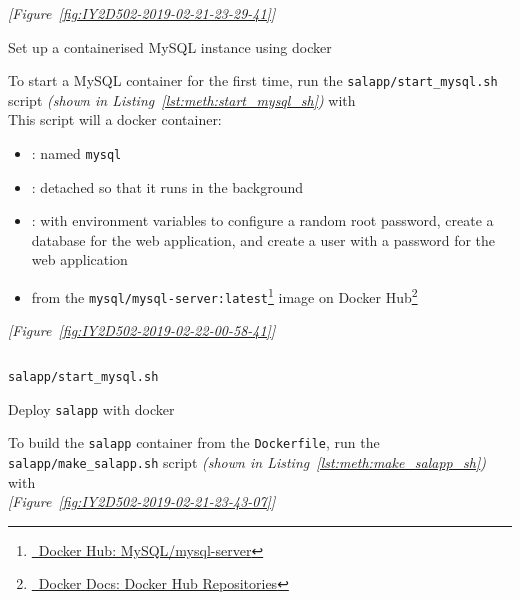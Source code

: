 \begin{methodology0}
\begin{methodology1}
      \textcolor{deep-gray}{\textit{[Figure~\ref{fig:IY2D502-2019-02-21-23-29-41}]}}
    \end{methodology1}
  \item Set up a containerised MySQL instance using docker
    \begin{methodology1}
      \item To start a MySQL container for the first time, run the \texttt{salapp/start\_mysql.sh} script \textit{(shown in Listing~\ref{lst:meth:start_mysql_sh})} with \\
        This script will  a docker container:
        \begin{itemize}
          \item {}: named \texttt{mysql}
          \item {}: detached so that it runs in the background
          \item {}: with environment variables to configure a random root password, create a database for the web application, and create a user with a password for the web application
          \item from the \texttt{mysql/mysql-server:latest}\footnote{\href{https://hub.docker.com/r/mysql/mysql-server/}{\faDocker\ Docker Hub: MySQL/mysql-server}} image on Docker Hub\footnote{\href{https://docs.docker.com/docker-hub/repos/}{\faDocker\ Docker Docs: Docker Hub Repositories}}
        \end{itemize}
        \textcolor{deep-gray}{\textit{[Figure~\ref{fig:IY2D502-2019-02-22-00-58-41}]}}
        \begin{listing}[H]
          \captionsetup{skip=\skiplistingcaptionlen}
          \inputminted[breakanywhere]{bash}{../uswacs-2-iy2d502-salapp/start_mysql.sh}
          \caption{\texttt{salapp/start\_mysql.sh}}
          \label{lst:meth:start_mysql_sh}
        \end{listing}
    \end{methodology1}
  \pagebreak
  \item Deploy \texttt{salapp} with docker
    \begin{methodology1}
      \item To build the \texttt{salapp} container from the \texttt{Dockerfile}, run the \texttt{salapp/make\_salapp.sh} script \textit{(shown in Listing~\ref{lst:meth:make_salapp_sh})} with \\
        \textcolor{deep-gray}{\textit{[Figure~\ref{fig:IY2D502-2019-02-21-23-43-07}]}}\\

\end{methodology1}
\end{methodology0}
